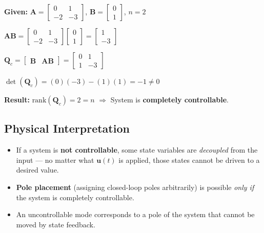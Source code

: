 \documentclass[12pt,a4paper]{article}
\begin{document}
\begin{tcolorbox}[examplebox, title={Example: Check Controllability}]
\textbf{Given:} $\mathbf{A}=\begin{bmatrix}0&1\\-2&-3\end{bmatrix}$, $\mathbf{B}=\begin{bmatrix}0\\1\end{bmatrix}$, $n=2$

$\mathbf{A}\mathbf{B} = \begin{bmatrix}0&1\\-2&-3\end{bmatrix}\begin{bmatrix}0\\1\end{bmatrix} = \begin{bmatrix}1\\-3\end{bmatrix}$

$\mathbf{Q}_c = \begin{bmatrix}\mathbf{B} & \mathbf{A}\mathbf{B}\end{bmatrix} = \begin{bmatrix}0&1\\1&-3\end{bmatrix}$

$\det(\mathbf{Q}_c) = (0)(-3) - (1)(1) = -1 \neq 0$

\textbf{Result:} $\text{rank}(\mathbf{Q}_c) = 2 = n$ $\Rightarrow$ System is \textbf{completely controllable}.
\end{tcolorbox}

\subsection{Physical Interpretation}

\begin{itemize}[leftmargin=*, itemsep=3pt]
  \item If a system is \textbf{not controllable}, some state variables are \textit{decoupled} from the input --- no matter what $\mathbf{u}(t)$ is applied, those states cannot be driven to a desired value.
  \item \textbf{Pole placement} (assigning closed-loop poles arbitrarily) is possible \textit{only if} the system is completely controllable.
  \item An uncontrollable mode corresponds to a pole of the system that cannot be moved by state feedback.
\end{itemize}
\end{document}
